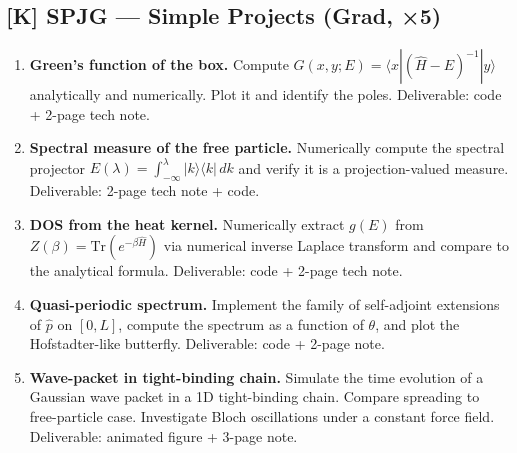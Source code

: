 \subsection*{[K] SPJG — Simple Projects (Grad, ×5)}
\begin{tcolorbox}[gradprobbox, title={SPJG · L01 · Tiers 4–5 · 3–8 hrs each}]
\begin{enumerate}[label=\textbf{PG\arabic*.}]
  \item \textbf{Green's function of the box.} Compute $G(x,y;E) = \langle x|(\hat{H}-E)^{-1}|y\rangle$ analytically and numerically. Plot it and identify the poles. Deliverable: code + 2-page tech note.
  \item \textbf{Spectral measure of the free particle.} Numerically compute the spectral projector $E(\lambda) = \int_{-\infty}^\lambda |k\rangle\langle k|\,dk$ and verify it is a projection-valued measure. Deliverable: 2-page tech note + code.
  \item \textbf{DOS from the heat kernel.} Numerically extract $g(E)$ from $Z(\beta) = \mathrm{Tr}(e^{-\beta\hat{H}})$ via numerical inverse Laplace transform and compare to the analytical formula. Deliverable: code + 2-page tech note.
  \item \textbf{Quasi-periodic spectrum.} Implement the family of self-adjoint extensions of $\hat{p}$ on $[0,L]$, compute the spectrum as a function of $\theta$, and plot the Hofstadter-like butterfly. Deliverable: code + 2-page note.
  \item \textbf{Wave-packet in tight-binding chain.} Simulate the time evolution of a Gaussian wave packet in a 1D tight-binding chain. Compare spreading to free-particle case. Investigate Bloch oscillations under a constant force field. Deliverable: animated figure + 3-page note.
\end{enumerate}
\end{tcolorbox}

